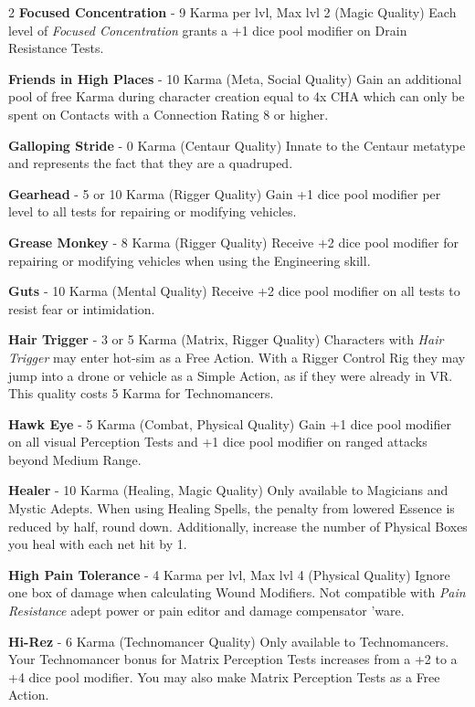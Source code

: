\documentclass[
  oneside]{article}
\begin{document}
\begin{multicols}{2}
\textbf{Focused Concentration} - 9 Karma per lvl,
Max lvl 2 (Magic Quality) Each level of
\emph{Focused Concentration} grants a +1 dice pool
modifier on Drain Resistance Tests.

\textbf{Friends in High Places} - 10 Karma (Meta,
Social Quality) Gain an additional pool of free
Karma during character creation equal to 4x CHA
which can only be spent on Contacts with a
Connection Rating 8 or higher.

\textbf{Galloping Stride} - 0 Karma (Centaur
Quality) Innate to the Centaur metatype and
represents the fact that they are a quadruped.

\textbf{Gearhead} - 5 or 10 Karma (Rigger Quality)
Gain +1 dice pool modifier per level to all tests
for repairing or modifying vehicles.

\textbf{Grease Monkey} - 8 Karma (Rigger Quality)
Receive +2 dice pool modifier for repairing or
modifying vehicles when using the Engineering
skill.

\textbf{Guts} - 10 Karma (Mental Quality) Receive
+2 dice pool modifier on all tests to resist fear
or intimidation.

\textbf{Hair Trigger} - 3 or 5 Karma (Matrix,
Rigger Quality) Characters with \emph{Hair
Trigger} may enter hot-sim as a Free Action. With
a Rigger Control Rig they may jump into a drone or
vehicle as a Simple Action, as if they were
already in VR. This quality costs 5 Karma for
Technomancers.

\textbf{Hawk Eye} - 5 Karma (Combat, Physical
Quality) Gain +1 dice pool modifier on all visual
Perception Tests and +1 dice pool modifier on
ranged attacks beyond Medium Range.

\textbf{Healer} - 10 Karma (Healing, Magic
Quality) Only available to Magicians and Mystic
Adepts. When using Healing Spells, the penalty
from lowered Essence is reduced by half, round
down. Additionally, increase the number of
Physical Boxes you heal with each net hit by 1.

\textbf{High Pain Tolerance} - 4 Karma per lvl,
Max lvl 4 (Physical Quality) Ignore one box of
damage when calculating Wound Modifiers. Not
compatible with \emph{Pain Resistance} adept power
or pain editor and damage compensator 'ware.

\textbf{Hi-Rez} - 6 Karma (Technomancer Quality)
Only available to Technomancers. Your Technomancer
bonus for Matrix Perception Tests increases from a
+2 to a +4 dice pool modifier. You may also make
Matrix Perception Tests as a Free Action.


\end{multicols}
\end{document}
